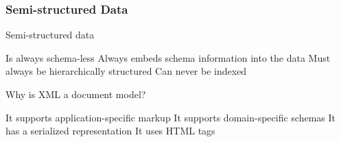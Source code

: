 \documentclass[12pt,a4paper]{exam} %
\begin{document}
\subsubsection{Semi-structured Data}
\begin{questions}
\question Semi-structured data
\begin{checkboxes}
\choice Is always schema-less
\CorrectChoice Always embeds schema information into the data
\choice Must always be hierarchically structured
\choice Can never be indexed
\end{checkboxes}

\question Why is XML a document model?
\begin{checkboxes}
\choice It supports application-specific markup
\choice It supports domain-specific schemas
\CorrectChoice It has a serialized representation
\choice It uses HTML tags
\end{checkboxes}
\end{questions}
\end{document}
